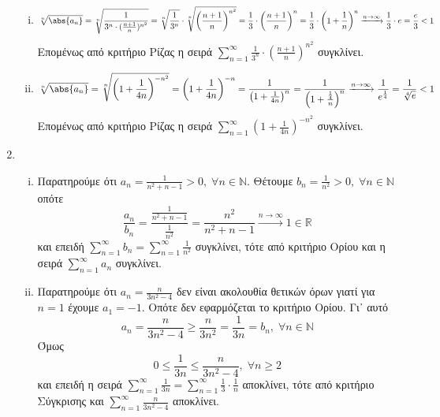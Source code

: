 \begin{enumerate}
\begin{enumerate}[i)]
        \item 
            \[
                \sqrt[n]{\abs{a_{n}}} = \sqrt[n]{\frac{1}{3^{n} 
                \cdot (\frac{n+1}{n})^{n^{2}}}} = \sqrt[n]{\frac{1}{3^{n}}} 
                \cdot \sqrt[n]{\left(\frac{n+1}{n} \right)^{n^{2}}} = 
                \frac{1}{3} \cdot \left(\frac{n+1}{n} \right)^{n} = \frac{1}{3} 
                \cdot \left(1+ \frac{1}{n} \right)^{n} \xrightarrow{n \to \infty} 
                \frac{1}{3} \cdot e = \frac{e}{3} <1 
            \] 
            Επομένως από κριτήριο Ρίζας η σειρά 
            $ \sum_{n=1}^{\infty} \frac{1}{3^{n}} \cdot 
            \left(\frac{n+1}{n} \right)^{n^{2}} $ συγκλίνει.

        \item 
            \[
                \sqrt[n]{\abs{a_{n}}} = \sqrt[n]{\left(1+ \frac{1}{4n} 
                \right)^{-n^{2}}} = \left(1+ \frac{1}{4n} \right)^{-n} = 
                \frac{1}{\left(1+ \frac{1}{4n} \right)^{n}} = 
                \frac{1}{\left(1 + \frac{\frac{1}{4}}{n}\right)^{n}} 
                \xrightarrow{n \to \infty} \frac{1}{e ^{\frac{1}{4}}} = 
                \frac{1}{\sqrt[4]{e}} <1 
             \] 
             Επομένως από κριτήριο Ρίζας η σειρά 
             $ \sum_{n=1}^{\infty} \left(1+ \frac{1}{4n} \right)^{-n^{2}} $ συγκλίνει.
    \end{enumerate}

\item 
    \begin{enumerate}[i)]
        \item Παρατηρούμε ότι $ a_{n}= \frac{1}{n^{2}+n-1} > 0, 
            \; \forall n \in \mathbb{N}$. Θέτουμε 
            $
            b_{n} = \frac{1}{n^{2}} > 0, \; \forall n \in \mathbb{N} 
            $ οπότε
            \[
                \frac{a_{n}}{b_{n}} = \frac{\frac{1}{n^{2}+n-1}}{\frac{1}{n^{2}}} = 
                \frac{n^{2}}{n^{2}+n-1} \xrightarrow{n \to \infty} 1 \in \mathbb{R} 
            \] 
            και επειδή $ \sum_{n=1}^{\infty} b_{n} = \sum_{n=1}^{\infty} 
            \frac{1}{n^{2}} $ συγκλίνει, τότε από κριτήριο Ορίου και η σειρά 
            $ \sum_{n=1}^{\infty} a_{n} $ συγκλίνει.

        \item Παρατηρούμε ότι $ a_{n}= \frac{n}{3n^{2}-4} $ δεν είναι ακολουθία 
            θετικών όρων γιατί για $ n=1 $ έχουμε $ a_{1} = -1 $. Οπότε δεν 
            εφαρμόζεται το κριτήριο Ορίου. Γι᾽ αυτό 
            \[
                a_{n}= \frac{n}{3n^{2}-4} \geq \frac{n}{3n^{2}} = \frac{1}{3n} =b_{n}, 
                \; \forall n \in \mathbb{N}
            \] 
            Όμως 
            \[
                0 \leq \frac{1}{3n} \leq \frac{n}{3n^{2}-4}, \; \forall n \geq 2 
            \]
            και επειδή η σειρά $ \sum_{n=1}^{\infty} \frac{1}{3n} = 
            \sum_{n=1}^{\infty} \frac{1}{3} \cdot \frac{1}{n}$ αποκλίνει, 
            τότε από κριτήριο Σύγκρισης και 
            $ \sum_{n=1}^{\infty} \frac{n}{3n^{2}-4}$ αποκλίνει.


\end{enumerate}
\end{enumerate}
